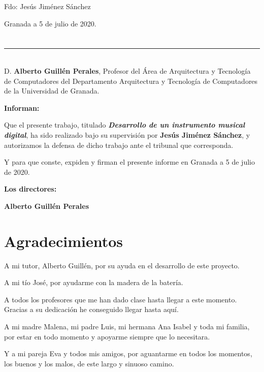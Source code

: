 \vspace{6cm}

\noindent Fdo: Jesús Jiménez Sánchez

\vspace{2cm}

\begin{flushright}
    Granada a 5 de julio de 2020.
\end{flushright}

\chapter*{}   %
\thispagestyle{empty}

\noindent\rule[-1ex]{\textwidth}{2pt}\\[4.5ex]

D. \textbf{Alberto Guillén Perales}, Profesor del Área de Arquitectura y Tecnología de Computadores del Departamento
Arquitectura y Tecnología de Computadores de la Universidad de Granada.

\vspace{0.5cm}

\textbf{Informan:}

\vspace{0.5cm}

Que el presente trabajo, titulado \textit{\textbf{Desarrollo de un instrumento musical digital}}, ha sido realizado bajo
su supervisión por \textbf{Jesús Jiménez Sánchez}, y autorizamos la defensa de dicho trabajo ante el tribunal que
corresponda.

\vspace{0.5cm}

Y para que conste, expiden y firman el presente informe en Granada a 5 de julio de 2020.

\vspace{1cm}

\textbf{Los directores:}

\vspace{5cm}

\noindent \textbf{Alberto Guillén Perales}

\chapter*{Agradecimientos}
\thispagestyle{empty}

    \vspace{1cm}

A mi tutor, Alberto Guillén, por su ayuda en el desarrollo de este proyecto.

A mi tío José, por ayudarme con la madera de la batería.

A todos los profesores que me han dado clase hasta llegar a este momento. Gracias a su dedicación he conseguido llegar
hasta aquí.

A mi madre Malena, mi padre Luis, mi hermana Ana Isabel y toda mi familia, por estar en todo momento y apoyarme siempre
que lo necesitara.

Y a mi pareja Eva y todos mis amigos, por aguantarme en todos los momentos, los buenos y los malos, de este largo y
sinuoso camino.
